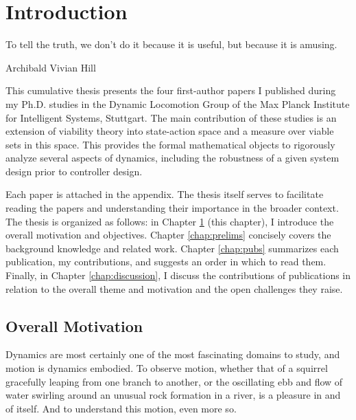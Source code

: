 
\chapter{Introduction} \label{chap:intro}
\epigraph{To tell the truth, we don't do it because it is useful, but because it is amusing.}{Archibald Vivian Hill}

This cumulative thesis presents the four first-author papers I published during my Ph.D. studies in the Dynamic Locomotion Group of the Max Planck Institute for Intelligent Systems, Stuttgart. The main contribution of these studies is an extension of viability theory into state-action space and a measure over viable sets in this space. This provides the formal mathematical objects to rigorously analyze several aspects of dynamics, including the robustness of a given system design prior to controller design. \par
Each paper is attached in the appendix. The thesis itself serves to facilitate reading the papers and understanding their importance in the broader context. The thesis is organized as follows: in Chapter \ref{chap:intro} (this chapter), I introduce the overall motivation and objectives.
Chapter \ref{chap:prelims} concisely covers the background knowledge and related work.
Chapter \ref{chap:pubs} summarizes each publication, my contributions, and suggests an order in which to read them.
Finally, in Chapter \ref{chap:discussion}, I discuss the contributions of publications in relation to the overall theme and motivation and the open challenges they raise.

\section{Overall Motivation}

Dynamics are most certainly one of the most fascinating domains to study, and motion is dynamics embodied. To observe motion, whether that of a squirrel gracefully leaping from one branch to another, or the oscillating ebb and flow of water swirling around an unusual rock formation in a river, is a pleasure in and of itself. And to understand this motion, even more so. \par

